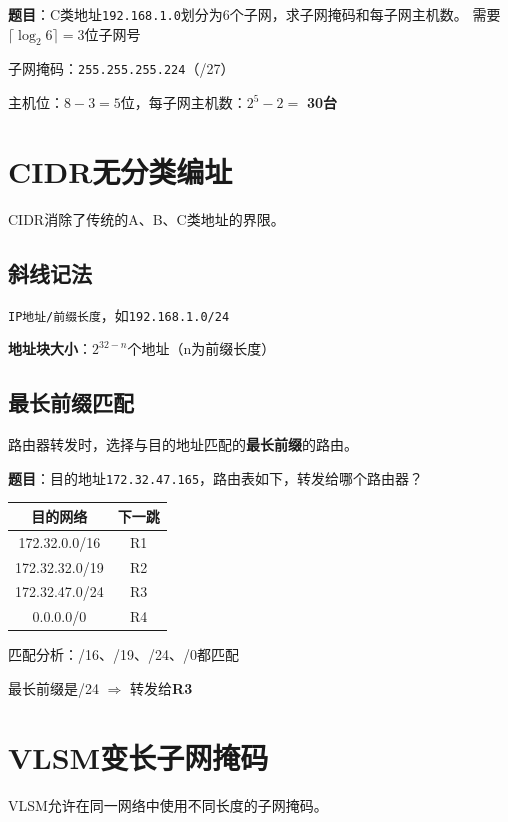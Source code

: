 \begin{examplebox}[例题4.1 子网划分]
\textbf{题目}：C类地址\texttt{192.168.1.0}划分为6个子网，求子网掩码和每子网主机数。
\tcblower
需要$\lceil\log_2 6\rceil = 3$位子网号

子网掩码：\texttt{255.255.255.224}（/27）

主机位：$8-3=5$位，每子网主机数：$2^5-2=$ \textbf{30台}
\end{examplebox}

\section{CIDR无分类编址}
CIDR消除了传统的A、B、C类地址的界限。

\subsection{斜线记法}
\texttt{IP地址/前缀长度}，如\texttt{192.168.1.0/24}

\textbf{地址块大小}：$2^{32-n}$个地址（n为前缀长度）

\subsection{最长前缀匹配}
路由器转发时，选择与目的地址匹配的\textbf{最长前缀}的路由。

\begin{examplebox}[例题4.2 最长前缀匹配]
\textbf{题目}：目的地址\texttt{172.32.47.165}，路由表如下，转发给哪个路由器？
\begin{center}\small
\begin{tabular}{|c|c|}
\hline
目的网络 & 下一跳 \\
\hline
172.32.0.0/16 & R1 \\
172.32.32.0/19 & R2 \\
172.32.47.0/24 & R3 \\
0.0.0.0/0 & R4 \\
\hline
\end{tabular}
\end{center}
\tcblower
匹配分析：/16、/19、/24、/0都匹配

最长前缀是/24 $\Rightarrow$ 转发给\textbf{R3}
\end{examplebox}

\section{VLSM变长子网掩码}
VLSM允许在同一网络中使用不同长度的子网掩码。

